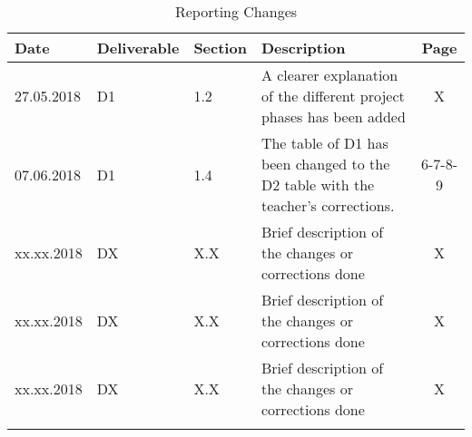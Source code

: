 \begin{longtable}[H]{l l l p{7cm} c}
	
	\toprule[2pt]
	
	\textbf{Date} & \textbf{Deliverable} & \textbf{Section} &  \textbf{Description} & \textbf{Page} \\
	
	\midrule[1.5pt] 
	\endhead
	
	27.05.2018 & D1 & 1.2  & A clearer explanation of the different project phases has been added & X \vspace{0.2cm} \\
	
	\midrule

	07.06.2018 & D1 & 1.4  & The table of D1 has been changed to the D2 table with the teacher's corrections. & 6-7-8-9 \vspace{0.2cm} \\
	
	\midrule

	xx.xx.2018 & DX & X.X  & Brief description of the changes or corrections done & X \vspace{0.2cm} \\
	
	\midrule

	xx.xx.2018 & DX & X.X  & Brief description of the changes or corrections done & X \vspace{0.2cm} \\
	
	\midrule
		
	xx.xx.2018 & DX & X.X  & Brief description of the changes or corrections done & X \vspace{0.2cm} \\
	
	\bottomrule[2pt]
	
	\caption{Reporting Changes}
\end{longtable}

